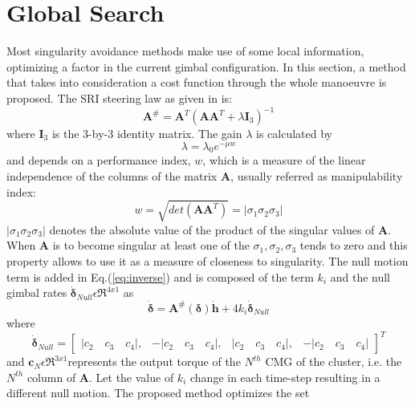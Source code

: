 \documentclass[journal]{new-aiaa}
\begin{document}
\section{Global Search}
Most singularity avoidance methods make use of some local information, optimizing a factor in the current gimbal configuration. In this section, a method that takes into consideration a cost function through the whole manoeuvre is proposed. The SRI steering law as given in \cite{nak_han} is:
\begin{equation}
\textbf{A}^{\#}=\textbf{A}^T(\textbf{A}\textbf{A}^T+\lambda \textbf{I}_3)^{-1}
\label{eq:SR_inverse}
\end{equation}
where $\textbf{I}_3$ is the 3-by-3 identity matrix.
The gain $\lambda$ is calculated by
\begin{equation}
\lambda=\lambda_0 e^{-\mu w}
\label{eq:lamda}
\end{equation}
and depends on a performance index, $w$, which is a measure of the linear independence of the columns of the matrix $\textbf{A}$, usually referred as manipulability index:
\begin{equation}
    \label{eq:manipulability}
    w=\sqrt{det(\textbf{A} \textbf{A}^T)}=|\sigma_1\sigma_2\sigma_3|
\end{equation} 
$|\sigma_1\sigma_2\sigma_3|$ denotes the absolute value of the product of the singular values of $\textbf{A}$. When $\textbf{A}$ is to become singular at least one of the $\sigma_1, \sigma_2, \sigma_3$ tends to zero and this property allows to use it as a measure of closeness to singularity.
The null motion term is added in Eq.(\ref{eq:inverse}) and is composed of the term $k_i$ and the null gimbal rates $\dot{\boldsymbol{\delta}}_{Null}\epsilon\Re^{4x1}$ as
\begin{equation}
\label{eq:nullk}
   \dot{\boldsymbol{\delta}}=\textbf{A}^{\#}(\boldsymbol{\delta}) \dot{ \textbf{h}} + 4k_i \dot{\boldsymbol{\delta}}_{Null}
\end{equation}
where
\begin{equation}
\label{eq:nulldelta}
 \dot{\boldsymbol{\delta}}_{Null}=
\begin{bmatrix}
|c_2 \quad c_3 \quad c_4|,& 
-|c_2 \quad c_3 \quad c_4|, &
|c_2 \quad c_3  \quad c_4|, &
-|c_2  \quad c_3 \quad c_4|
\end{bmatrix}^T
\end{equation}
and $\textbf{c}_N\epsilon \Re^{3x1}$represents the output torque of the $N^{th}$ CMG of the cluster, i.e. the $N^{th}$ column of $\textbf{A}$.
Let the value of $k_i$ change in each time-step resulting in a different null motion. The proposed method optimizes the set 
\end{document}
